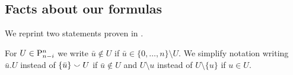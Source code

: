 %

\subsection{Facts about our formulas}\label{ss:fact}

We reprint two statements proven in \cite{medina2023fast_sq}.

\begin{notation*}
	For $U \in \P_{n-i}^n$ we write $\bar u \notin U$ if $\bar u \in \{0, \dots, n\} \setminus U$.
	We simplify notation writing $\bar u.U$ instead of $\{\bar u\} \union U$ if $\bar u \notin U$ and $U \setminus u$ instead of $U \setminus \{u\}$ if $u \in U$.
\end{notation*}

